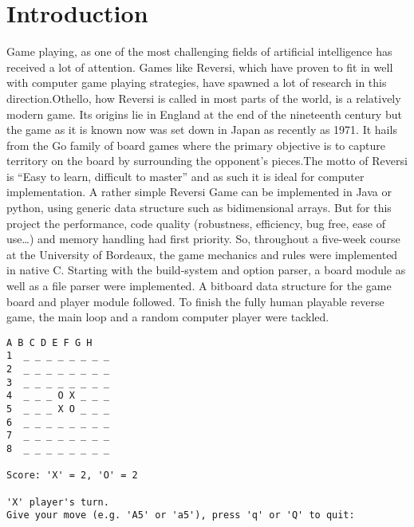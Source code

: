 
\chapter{Introduction}\label{chapter:introduction}
Game playing, as one of the most challenging fields of artificial intelligence has received a lot of attention. Games like Reversi, which have proven to fit in well with computer game playing strategies, have spawned a lot of research in this direction.\newline Othello, how Reversi is called in most parts of the world, is a relatively modern game. Its origins lie in England at the end of the nineteenth century but the game as it is known now was set down in Japan as recently as 1971.\cite{OthelloGamePlayer} It hails from the Go family of board games where the primary objective is to capture territory on the board by surrounding the opponent’s pieces.\newline The motto of Reversi is “Easy to learn, difficult to master” and as such it is ideal for computer implementation. A rather simple Reversi Game can be implemented in Java or python, using generic data structure such as bidimensional arrays. But for this project the performance, code quality (robustness, efficiency, bug free, ease of use…) and memory handling had first priority. So, throughout a five-week course at the University of Bordeaux, the game mechanics and rules were implemented in native C. Starting with the build-system and option parser, a board module as well as a file parser were implemented. A bitboard data structure \cite{quteprints85005} for the game board and player module followed. To finish the fully human playable reverse game, the main loop and a random computer player were tackled.
\begin{Verbatim}[frame=single]
   A B C D E F G H
1  _ _ _ _ _ _ _ _
2  _ _ _ _ _ _ _ _
3  _ _ _ _ _ _ _ _
4  _ _ _ O X _ _ _
5  _ _ _ X O _ _ _
6  _ _ _ _ _ _ _ _
7  _ _ _ _ _ _ _ _
8  _ _ _ _ _ _ _ _

Score: 'X' = 2, 'O' = 2

'X' player's turn.
Give your move (e.g. 'A5' or 'a5'), press 'q' or 'Q' to quit:
\end{Verbatim}

